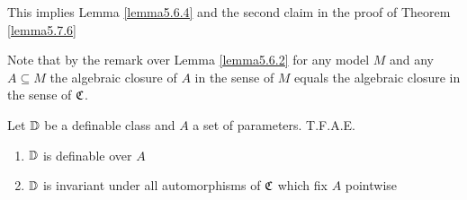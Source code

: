 \documentclass[11pt]{article}
\begin{document}
This implies Lemma \ref{lemma5.6.4} and the second claim in the proof of Theorem \ref{lemma5.7.6}


Note that by the remark over Lemma \ref{lemma5.6.2} for any model \(M\) and any \(A\subseteq M\) the
algebraic closure of \(A\) in the sense of \(M\) equals the algebraic closure in the sense
of \(\mathfrak{C}\).

\begin{lemma}[]
Let \(\mathbb{D}\) be a definable class and \(A\) a set of parameters. T.F.A.E.
\begin{enumerate}
\item \(\mathbb{D}\) is definable over \(A\)
\item \(\mathbb{D}\) is invariant under all automorphisms of \(\mathfrak{C}\) which fix \(A\) pointwise
\end{enumerate}
\end{lemma}
\end{document}
